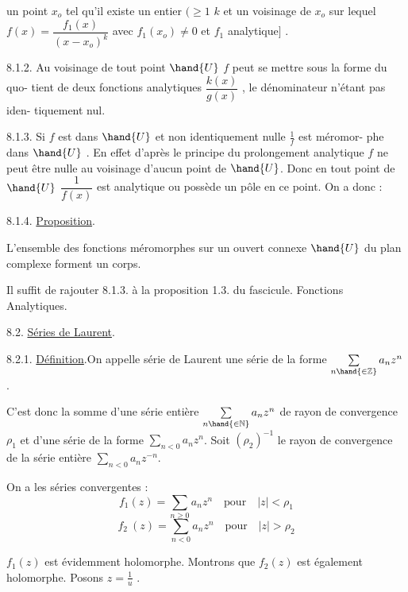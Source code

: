 
un point $x_o$ tel qu'il existe un entier $( \geq 1$ $k$ et un voisinage de $x_o$ sur
lequel $f(x) = \dfrac{f_1(x)}{(x-x_o)^k}$ avec $f_1(x_o) \neq 0$ et $f_1$ analytique$]$ .

8.1.2. Au voisinage de tout point $\hand{U}$ $f$ peut se mettre sous la forme du quo-%
tient de deux fonctions analytiques $\dfrac{k(x)}{g(x)}$ , le dénominateur n'étant pas iden-%
tiquement nul.

8.1.3. Si $f$ est  dans $\hand{U}$ et non identiquement nulle $\frac{1}{f}$ est méromor-%
phe dans $\hand{U}$ . En effet d'après le principe du prolongement analytique $f$ ne
peut être nulle au voisinage d'aucun point de $\hand{U}$. Donc en tout point de $\hand{U}$ $\dfrac{1}{f(x)}$
est analytique ou possède un pôle en ce point. On a donc :

8.1.4. \uline{Proposition}.

L'ensemble des fonctions méromorphes sur un ouvert connexe $\hand{U}$ du
plan complexe forment un corps.

Il suffit de rajouter 8.1.3. à la proposition 1.3. du fascicule.
Fonctions Analytiques.

8.2. \uline{Séries de Laurent}.

8.2.1. \uline{Définition}.On appelle série de Laurent une série de la forme $\sum\limits_{n \hand{\in \mathbb{Z}}} a_n z^n$ .

C'est donc la somme d'une série entière $\sum\limits_{n \hand{\in \mathbb{N}}} a_n z^n$ de rayon de convergence $\rho_1$
et d'une série de la forme $\sum\limits_{n<0} a_n z^n$. Soit $(\rho_2)^{-1}$ le rayon de convergence de
la série entière $\sum\limits_{n<0} a_n z^{-n}$.

On a les séries convergentes :
\[ f_1(z) = \sum_{n \geq 0} a_n z^n \quad \text{pour} \quad |z| < \rho_1 \]
\[ f_2\ (z) = \sum_{n < 0} a_n z^n \quad \text{pour} \quad |z| > \rho_2 \]

$f_1(z)$ est évidemment holomorphe. Montrons que $f_2(z)$ est également
holomorphe. Posons $z = \frac{1}{u}$ .

